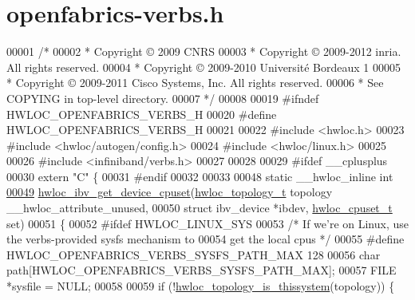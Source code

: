 \hypertarget{a00037_source}{
\section{openfabrics-\/verbs.h}
}

\begin{DoxyCode}
00001 \textcolor{comment}{/*}
00002 \textcolor{comment}{ * Copyright © 2009 CNRS}
00003 \textcolor{comment}{ * Copyright © 2009-2012 inria.  All rights reserved.}
00004 \textcolor{comment}{ * Copyright © 2009-2010 Université Bordeaux 1}
00005 \textcolor{comment}{ * Copyright © 2009-2011 Cisco Systems, Inc.  All rights reserved.}
00006 \textcolor{comment}{ * See COPYING in top-level directory.}
00007 \textcolor{comment}{ */}
00008 
00019 \textcolor{preprocessor}{#ifndef HWLOC\_OPENFABRICS\_VERBS\_H}
00020 \textcolor{preprocessor}{}\textcolor{preprocessor}{#define HWLOC\_OPENFABRICS\_VERBS\_H}
00021 \textcolor{preprocessor}{}
00022 \textcolor{preprocessor}{#include <hwloc.h>}
00023 \textcolor{preprocessor}{#include <hwloc/autogen/config.h>}
00024 \textcolor{preprocessor}{#include <hwloc/linux.h>}
00025 
00026 \textcolor{preprocessor}{#include <infiniband/verbs.h>}
00027 
00028 
00029 \textcolor{preprocessor}{#ifdef \_\_cplusplus}
00030 \textcolor{preprocessor}{}\textcolor{keyword}{extern} \textcolor{stringliteral}{"C"} \{
00031 \textcolor{preprocessor}{#endif}
00032 \textcolor{preprocessor}{}
00033 
00048 \textcolor{keyword}{static} \_\_hwloc\_inline \textcolor{keywordtype}{int}
\hypertarget{a00037_source_l00049}{}\hyperlink{a00072_gaa8ea979ce3a9b8c70ae80bc5716a0fbe}{00049} \hyperlink{a00072_gaa8ea979ce3a9b8c70ae80bc5716a0fbe}{hwloc_ibv_get_device_cpuset}(\hyperlink{a00039_ga9d1e76ee15a7dee158b786c30b6a6e38}{hwloc_topology_t} topology \_\_hwloc\_attribute\_unused,
00050                             \textcolor{keyword}{struct} ibv\_device *ibdev, \hyperlink{a00040_ga4bbf39b68b6f568fb92739e7c0ea7801}{hwloc_cpuset_t} \textcolor{keyword}{set})
00051 \{
00052 \textcolor{preprocessor}{#ifdef HWLOC\_LINUX\_SYS}
00053 \textcolor{preprocessor}{}  \textcolor{comment}{/* If we're on Linux, use the verbs-provided sysfs mechanism to}
00054 \textcolor{comment}{     get the local cpus */}
00055 \textcolor{preprocessor}{#define HWLOC\_OPENFABRICS\_VERBS\_SYSFS\_PATH\_MAX 128}
00056 \textcolor{preprocessor}{}  \textcolor{keywordtype}{char} path[HWLOC\_OPENFABRICS\_VERBS\_SYSFS\_PATH\_MAX];
00057   FILE *sysfile = NULL;
00058 
00059   \textcolor{keywordflow}{if} (!\hyperlink{a00046_ga0d109e33fc7990f62f665d336e5e5111}{hwloc_topology_is_thissystem}(topology)) \{

\end{DoxyCode}
